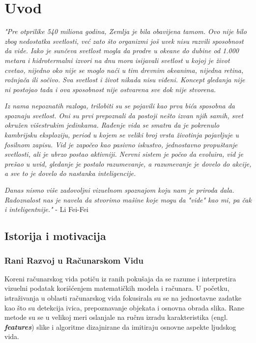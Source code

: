 \documentclass[12pt]{article}
\begin{document}
   \section{Uvod}
   
   \textit{"Pre otprilike 540 miliona godina, 
   Zemlja je bila obavijena tamom.
   Ovo nije bilo zbog nedostatka svetlosti,
   već zato što organizmi još uvek nisu razvili sposobnost da vide.
   Iako je sunčeva svetlost mogla da prodre u okeane do dubine
   od 1.000 metara i hidrotermalni izvori na dnu mora isijavali 
   svetlost u kojoj je život cvetao, nijedno oko nije se moglo naći 
   u tim drevnim okeanima, nijedna retina, rožnjača ili sočivo. 
   Sva svetlost i život nikada nisu viđeni. Koncept gledanja nije ni postojao tada 
   i ova sposobnost nije ostvarena sve dok nije stvorena.
   }
   
   \textit{Iz nama nepoznatih razloga, trilobiti su se pojavili kao prva bića sposobna
   da spoznaju svetlost. Oni su prvi prepoznali da postoji nešto izvan
   njih samih, svet okružen višestrukim jedinkama. Rađenje vida se smatra da je pokrenulo
   kambrijsku eksploziju, period u kojem se veliki broj vrsta životinja pojavljuje u 
   fosilnom zapisu. Vid je započeo kao pasivno iskustvo, jednostavno propuštanje svetlosti, 
   ali je ubrzo postao aktivniji. Nervni sistem je počeo da evoluira, vid je prešao u uvid, 
   gledanje je postalo razumevanje, a razumevanje je dovelo do akcije, a sve to je dovelo do 
   nastanka inteligencije.}
   
   \textit{Danas nismo više zadovoljni vizuelnom spoznajom koju nam je priroda dala. 
   Radoznalost nas je navela da stvorimo mašine koje mogu da "vide" kao mi, pa čak i inteligentnije."} - Li Fei-Fei \cite{li_fei_fei}
   

   \subsection{Istorija i motivacija}
   \vspace{-0.5cm}
   \subsubsection{Rani Razvoj u Računarskom Vidu}

   Koreni računarskog vida potiču iz ranih pokušaja da se razume 
   i interpretira vizuelni podatak korišćenjem matematičkih modela i računara. 
   U početku, istraživanja u oblasti računarskog vida fokusirala su se na 
   jednostavne zadatke kao što su detekcija ivica, prepoznavanje objekata i 
   osnovna obrada slika. Rane metode su se u velikoj meri oslanjale na ručnu 
   izradu karakteristika (engl. \textbf{\textit{features}}) slike i algoritme dizajnirane da imitiraju osnovne aspekte 
   ljudskog vida.
\end{document}
